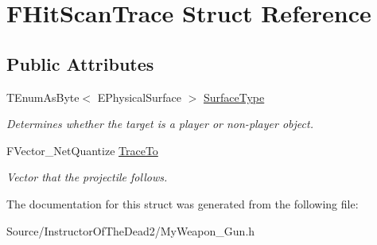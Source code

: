 \hypertarget{struct_f_hit_scan_trace}{}\section{F\+Hit\+Scan\+Trace Struct Reference}
\label{struct_f_hit_scan_trace}
\subsection*{Public Attributes}
\begin{DoxyCompactItemize}
\item 
\mbox{\label{struct_f_hit_scan_trace_adf2be583210a6d43ee5697cff3c46040}} 
T\+Enum\+As\+Byte$<$ E\+Physical\+Surface $>$ \mbox{\hyperlink{struct_f_hit_scan_trace_adf2be583210a6d43ee5697cff3c46040}{Surface\+Type}}
\begin{DoxyCompactList}\small\item\em Determines whether the target is a player or non-\/player object. \end{DoxyCompactList}\item 
\mbox{\label{struct_f_hit_scan_trace_a603adcd1a2ce6f1c504ee112a0978d5a}} 
F\+Vector\+\_\+\+Net\+Quantize \mbox{\hyperlink{struct_f_hit_scan_trace_a603adcd1a2ce6f1c504ee112a0978d5a}{Trace\+To}}
\begin{DoxyCompactList}\small\item\em Vector that the projectile follows. \end{DoxyCompactList}\end{DoxyCompactItemize}


The documentation for this struct was generated from the following file\+:\begin{DoxyCompactItemize}
\item 
Source/\+Instructor\+Of\+The\+Dead2/My\+Weapon\+\_\+\+Gun.\+h\end{DoxyCompactItemize}

